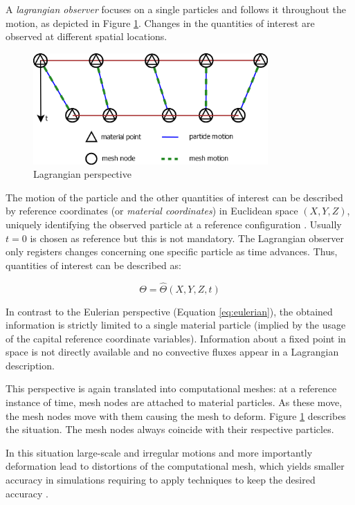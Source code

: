 A \textit{lagrangian observer} focuses on a single particles and follows it throughout the motion, as depicted in Figure \ref{fig:lagrangian}. Changes in the quantities of interest are observed at different spatial locations. 

\begin{figure}[htbp!]
	\centering
	\includegraphics[width=0.8\textwidth]{images/lagrangian}
	\caption{Lagrangian perspective}
	\label{fig:lagrangian}
\end{figure}

The motion of the particle and the other quantities of interest can be described by reference coordinates (or \textit{material coordinates}) in Euclidean space $(X, Y, Z)$, uniquely identifying the observed particle at a reference configuration \cite{XING201957}. Usually $t = 0$ is chosen as reference but this is not mandatory. The Lagrangian observer only registers changes concerning one specific particle as time advances. Thus, quantities of interest can be described as:

\begin{equation}
	\Theta = \hat{\Theta}(X, Y, Z, t)
\end{equation}

In contrast to the Eulerian perspective (Equation \ref{eq:eulerian}), the obtained information is strictly limited to a single material particle (implied by the usage of the capital reference coordinate variables). 
Information about a fixed point in space is not directly available and no convective fluxes appear in a Lagrangian description.

This perspective is again translated into computational meshes: at a reference instance of time, mesh nodes are attached to material particles. As these move, the mesh nodes move with them causing the mesh to deform. Figure \ref{fig:lagrangian} describes the situation. The mesh nodes always coincide with their respective particles.

In this situation large-scale and irregular motions and more importantly deformation lead to distortions of the computational mesh, which yields smaller accuracy in simulations requiring to apply techniques to keep the desired accuracy \cite{lipton2010robustness}.

